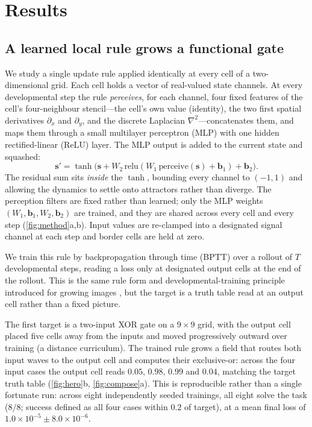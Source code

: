 \section{Results}

\subsection{A learned local rule grows a functional gate}

We study a single update rule applied identically at every cell of a two-dimensional grid. Each cell holds a vector of real-valued state channels. At every developmental step the rule \emph{perceives}, for each channel, four fixed features of the cell's four-neighbour stencil---the cell's own value (identity), the two first spatial derivatives $\partial_x$ and $\partial_y$, and the discrete Laplacian $\nabla^2$---concatenates them, and maps them through a small multilayer perceptron (MLP) with one hidden rectified-linear (ReLU) layer. The MLP output is added to the current state and squashed:
\begin{equation}
  \mathbf{s}' = \tanh\!\big(\mathbf{s} + W_2\,\mathrm{relu}(W_1\,\mathrm{perceive}(\mathbf{s}) + \mathbf{b}_1) + \mathbf{b}_2\big).
  \label{eq:rule}
\end{equation}
The residual sum sits \emph{inside} the $\tanh$, bounding every channel to $(-1,1)$ and allowing the dynamics to settle onto attractors rather than diverge. The perception filters are fixed rather than learned; only the MLP weights $(W_1,\mathbf{b}_1,W_2,\mathbf{b}_2)$ are trained, and they are shared across every cell and every step (\ref{fig:method}a,b). Input values are re-clamped into a designated signal channel at each step and border cells are held at zero.

We train this rule by backpropagation through time (BPTT) \citep{werbos1990bptt} over a rollout of $T$ developmental steps, reading a loss only at designated output cells at the end of the rollout. This is the same rule form and developmental-training principle introduced for growing images \citep{mordvintsev2020growing}, but the target is a truth table read at an output cell rather than a fixed picture.

The first target is a two-input XOR gate on a $9\times9$ grid, with the output cell placed five cells away from the inputs and moved progressively outward over training (a distance curriculum). The trained rule grows a field that routes both input waves to the output cell and computes their exclusive-or: across the four input cases the output cell reads $0.05$, $0.98$, $0.99$ and $0.04$, matching the target truth table (\ref{fig:hero}b, \ref{fig:compose}a). This is reproducible rather than a single fortunate run: across eight independently seeded trainings, all eight solve the task ($8/8$; success defined as all four cases within $0.2$ of target), at a mean final loss of $1.0\times10^{-5} \pm 8.0\times10^{-6}$.

